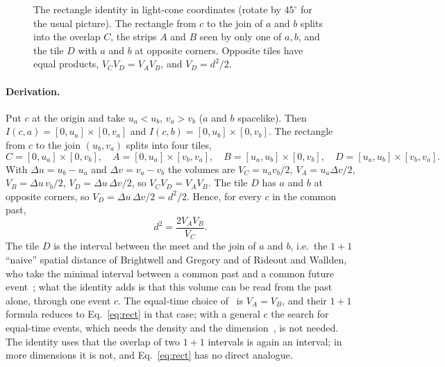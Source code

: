 \documentclass[11pt,a4paper]{article}
\begin{document}
\begin{figure}[t]
\centering
{}
\caption{The rectangle identity in light-cone coordinates (rotate by $45^\circ$ for the usual picture). The rectangle from $c$ to the join of $a$ and $b$ splits into the overlap $C$, the strips $A$ and $B$ seen by only one of $a,b$, and the tile $D$ with $a$ and $b$ at opposite corners. Opposite tiles have equal products, $V_CV_D=V_AV_B$, and $V_D=d^2/2$.}
\label{fig:tiles}
\end{figure}

\paragraph{Derivation.} Put $c$ at the origin and take $u_a<u_b$, $v_a>v_b$ ($a$ and $b$ spacelike). Then $I(c,a)=[0,u_a]\times[0,v_a]$ and $I(c,b)=[0,u_b]\times[0,v_b]$. The rectangle from $c$ to the join $(u_b,v_a)$ splits into four tiles,
\begin{equation}
C=[0,u_a]\times[0,v_b],\quad A=[0,u_a]\times[v_b,v_a],\quad B=[u_a,u_b]\times[0,v_b],\quad D=[u_a,u_b]\times[v_b,v_a].
\end{equation}
With $\Delta u=u_b-u_a$ and $\Delta v=v_a-v_b$ the volumes are $V_C=u_av_b/2$, $V_A=u_a\Delta v/2$, $V_B=\Delta u\,v_b/2$, $V_D=\Delta u\,\Delta v/2$, so $V_CV_D=V_AV_B$. The tile $D$ has $a$ and $b$ at opposite corners, so $V_D=\Delta u\,\Delta v/2=d^2/2$. Hence, for every $c$ in the common past,
\begin{equation}
d^2=\frac{2V_AV_B}{V_C}.
\label{eq:rect}
\end{equation}
The tile $D$ is the interval between the meet and the join of $a$ and $b$, i.e.\ the $1+1$ ``naive'' spatial distance of Brightwell and Gregory and of Rideout and Wallden, who take the minimal interval between a common past and a common future event~\cite{BrightwellGregory91,RideoutWallden09}; what the identity adds is that this volume can be read from the past alone, through one event $c$. The equal-time choice of~\cite{BK24} is $V_A=V_B$, and their $1+1$ formula reduces to Eq.~\eqref{eq:rect} in that case; with a general $c$ the search for equal-time events, which needs the density and the dimension~\cite{BK24}, is not needed. The identity uses that the overlap of two $1+1$ intervals is again an interval; in more dimensions it is not, and Eq.~\eqref{eq:rect} has no direct analogue.
\end{document}
